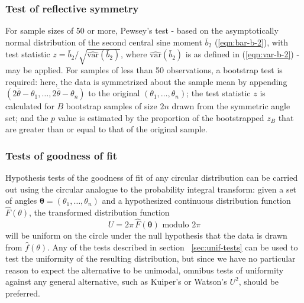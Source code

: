 \documentclass[../../ArchStats.tex]{subfiles}
\begin{document}
\subsubsection{Test of reflective symmetry}
\label{sec:refl-symmetry}

For sample sizes of 50 or more, Pewsey's test\cite{Pewsey2002} - based on the asymptotically normal distribution of the second central sine moment $\bar{b}_2$ (\ref{eqn:bar-b-2}), with test statistic $z = \bar{b}_2 / \sqrt{\widehat{\text{var}}(\bar{b}_2)}$, where $\widehat{\text{var}}(\bar{b}_2)$ is as defined in (\ref{eqn:var-b-2}) - may be applied. For samples of less than 50 observations, a bootstrap test is required: here, the data is symmetrized about the sample mean by appending $(2\bar{\theta} - \theta_1, \dots, 2\bar{\theta} - \theta_n)$ to the original $(\theta_1, \dots, \theta_n)$; the test statistic $z$ is calculated for $B$ bootstrap samples of size $2n$ drawn from the symmetric angle set; and the $p$ value is estimated by the proportion of the bootstrapped $z_B$ that are greater than or equal to that of the original sample.

\subsubsection{Tests of goodness of fit}
\label{sec:GoF}

Hypothesis tests of the goodness of fit of any circular distribution can be carried out using the circular analogue to the probability integral transform: given a set of angles $\mathbf{\theta} = (\theta_1, \dots, \theta_n)$ and a hypothesized continuous distribution function $\hat{F}(\theta)$, the transformed distribution function
\begin{equation}
U = 2\pi \, \hat{F}(\mathbf{\theta}) \text{ modulo } 2\pi
\end{equation}
will be uniform on the circle under the null hypothesis that the data is drawn from $\hat{f}(\theta)$. Any of the tests described in section ~\ref{sec:unif-tests} can be used to test the uniformity of the resulting distribution, but since we have no particular reason to expect the alternative to be unimodal, omnibus tests of uniformity against any general alternative, such as Kuiper's or Watson's $U^2$, should be preferred.
\end{document}
